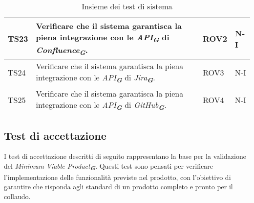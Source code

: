 \begin{table}[h!]
\begin{tabularx}{\textwidth}{|p{}|X|p{}|p{}|}
    TS23 & Verificare che il sistema garantisca la piena integrazione con le \emph{API}\textsubscript{\textit{\textbf{G}}} di \emph{Confluence}\textsubscript{\textit{\textbf{G}}}. & ROV2 & N-I \\ \hline
    TS24 & Verificare che il sistema garantisca la piena integrazione con le \emph{API}\textsubscript{\textit{\textbf{G}}} di \emph{Jira}\textsubscript{\textit{\textbf{G}}}. & ROV3 & N-I \\ \hline
    TS25 & Verificare che il sistema garantisca la piena integrazione con le \emph{API}\textsubscript{\textit{\textbf{G}}} di \emph{GitHub}\textsubscript{\textit{\textbf{G}}}. & ROV4 & N-I \\ \hline
    \end{tabularx}
    \caption{Insieme dei test di sistema}
\end{table}
\newpage


\subsection{Test di accettazione}
\label{sec:Test di accettazione}
I test di accettazione descritti di seguito rappresentano la base per la validazione del \emph{Minimum Viable Product}\textsubscript{\textit{\textbf{G}}}. 
Questi test sono pensati per verificare l’implementazione delle funzionalità previste nel prodotto, 
con l’obiettivo di garantire che risponda agli standard di un prodotto completo e pronto per il collaudo.

